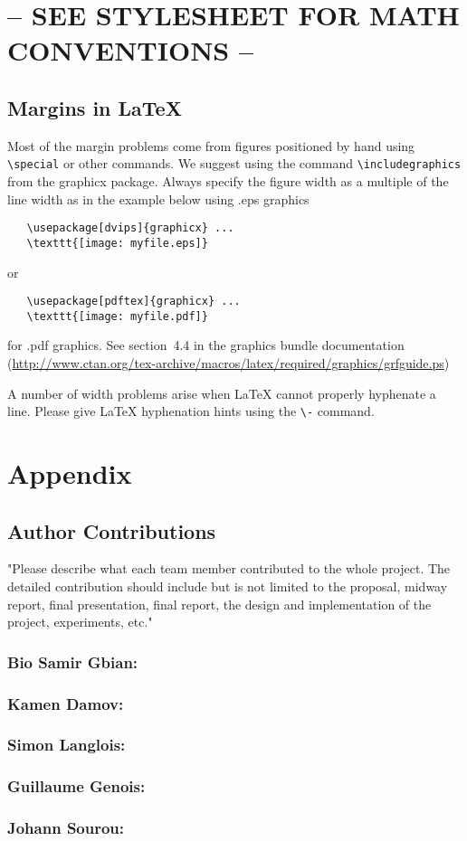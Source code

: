 \documentclass{article} %
\begin{document}
\section*{\textbf{-- SEE STYLESHEET FOR MATH CONVENTIONS --}}


\subsection{Margins in LaTeX}

Most of the margin problems come from figures positioned by hand using
\verb+\special+ or other commands. We suggest using the command
\verb+\includegraphics+
from the graphicx package. Always specify the figure width as a multiple of
the line width as in the example below using .eps graphics
\begin{verbatim}
   \usepackage[dvips]{graphicx} ...
   \texttt{[image: myfile.eps]}
\end{verbatim}
or %
\begin{verbatim}
   \usepackage[pdftex]{graphicx} ...
   \texttt{[image: myfile.pdf]}
\end{verbatim}
for .pdf graphics.
See section~4.4 in the graphics bundle documentation (\url{http://www.ctan.org/tex-archive/macros/latex/required/graphics/grfguide.ps})

A number of width problems arise when LaTeX cannot properly hyphenate a
line. Please give LaTeX hyphenation hints using the \verb+\-+ command.

\newpage
\nocite{*}



\newpage
\appendix
\section{Appendix}
\subsection*{Author Contributions}
"Please describe what each team member contributed to the
whole project. The detailed contribution should include but is not limited to the proposal, midway report, final presentation, final report, the design and implementation of the project, experiments, etc."

\subsubsection*{\textbf{Bio Samir Gbian:}}

\subsubsection*{\textbf{Kamen Damov:}}

\subsubsection*{\textbf{Simon Langlois:}}

\subsubsection*{\textbf{Guillaume Genois:}}

\subsubsection*{\textbf{Johann Sourou:}}
\end{document}
